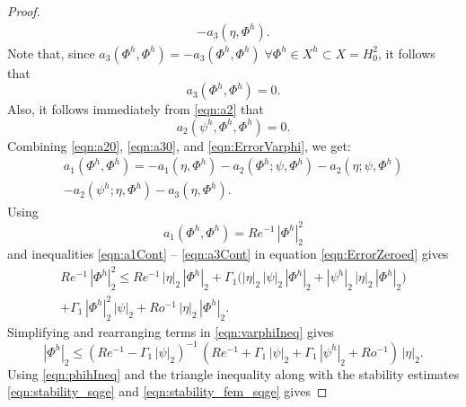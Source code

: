 \begin{proof}
\begin{equation}
\begin{split}
      -a_3(\eta,\Phi^h).
    \end{split}
    \label{eqn:ErrorVarphi}
  \end{equation}
  Note that, since $a_3(\Phi^h,\Phi^h)=-a_3(\Phi^h,\Phi^h)\; \forall
  \Phi^h \in X^h \subset X = H^2_0$, it follows that
  \begin{equation}
    a_3(\Phi^h,\Phi^h)=0 .
    \label{eqn:a30}
  \end{equation}
  Also, it follows immediately from \eqref{eqn:a2} that
  \begin{equation}
    a_2(\psi^h,\Phi^h,\Phi^h)=0 .
    \label{eqn:a20}
  \end{equation}
  Combining \eqref{eqn:a20}, \eqref{eqn:a30}, and \eqref{eqn:ErrorVarphi}, we get:
  \begin{equation}
    \begin{split}
      a_1(\Phi^h,\Phi^h) = -a_1(\eta,\Phi^h)
      - a_2(\Phi^h;\psi,\Phi^h) - a_2(\eta;\psi,\Phi^h) \\
      - a_2(\psi^h;\eta,\Phi^h) - a_3(\eta,\Phi^h).
    \end{split}
    \label{eqn:ErrorZeroed}
  \end{equation}
  Using
  \begin{equation*}
    a_1(\Phi^h,\Phi^h) = Re^{-1} \, |\Phi^h|^2_2
  \end{equation*}
  and inequalities \eqref{eqn:a1Cont} -- \eqref{eqn:a3Cont} in equation
  \eqref{eqn:ErrorZeroed} gives
  \begin{equation}
    \begin{split}
      Re^{-1} \, |\Phi^h|^2_2 \le Re^{-1} \,  |\eta|_2 \, |\Phi^h|_2 + \Gamma_1
      \biggl( |\eta|_2 \, |\psi|_2 \, |\Phi^h|_2 + |\psi^h|_2 \, |\eta|_2 \, |\Phi^h|_2 \biggr) \\
      + \Gamma_1 \, |\Phi^h|^2_2 \, |\psi|_2 + Ro^{-1} \, |\eta|_2 \, |\Phi^h|_2 .
    \end{split}
    \label{eqn:varphiIneq}
  \end{equation}
  Simplifying and rearranging terms in \eqref{eqn:varphiIneq} gives
  \begin{equation}
      |\Phi^h|_2
      \le
      \left(
      Re^{-1}
      - \Gamma_1 \, | \psi |_2
      \right)^{-1} \,
      \left(
      Re^{-1}
      + \Gamma_1 \, |\psi|_2
      + \Gamma_1 \, |\psi^h|_2
      + Ro^{-1}
      \right) \,
      |\eta|_2 .
    \label{eqn:phihIneq}
  \end{equation}
  Using \eqref{eqn:phihIneq} and the triangle inequality along with the stability estimates \eqref{eqn:stability_sqge} and \eqref{eqn:stability_fem_sqge} gives

\end{proof}
